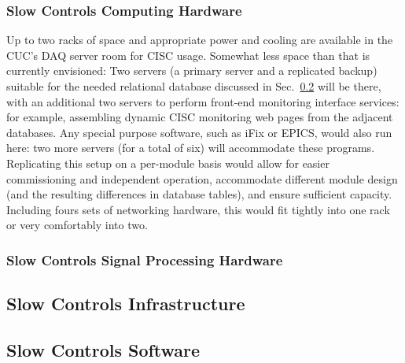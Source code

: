 \subsubsection{Slow Controls Computing Hardware}
\label{sec:fdsp-slow-cryo-slow-compute}

Up to two racks of space and appropriate power and cooling are available
in the CUC's DAQ server room for CISC usage.  Somewhat less space than
that is currently envisioned: Two servers (a primary server and a
replicated backup) suitable for the needed relational database discussed
in Sec.~\ref{sec:fdsp-slow-cryo-sw} will be there, with an additional
two servers to perform front-end monitoring interface services: for
example, assembling dynamic CISC monitoring web pages from the adjacent
databases.  Any special purpose software, such as iFix or EPICS, would
also run here: two more servers (for a total of six) will accommodate
these programs.
Replicating this setup on a per-module basis would allow for easier
commissioning and independent operation, accommodate different module
design (and the resulting differences in database tables), and ensure
sufficient capacity.  Including fours sets of networking hardware, this
would fit tightly into one rack or very comfortably into two.

\subsubsection{Slow Controls Signal Processing Hardware}
\label{sec:fdsp-slow-cryo-slow-dsp}



\subsection{Slow Controls Infrastructure}
\label{sec:fdsp-slow-cryo-slow-infra}

\subsection{Slow Controls Software}
\label{sec:fdsp-slow-cryo-sw}

